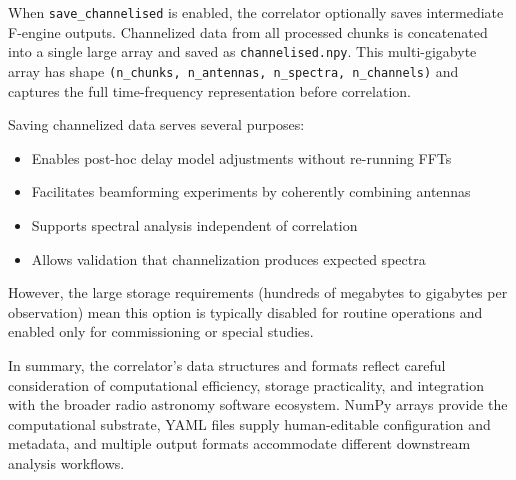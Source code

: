 When \texttt{save\_channelised} is enabled, the correlator optionally saves intermediate F-engine outputs. Channelized data from all processed chunks is concatenated into a single large array and saved as \texttt{channelised.npy}. This multi-gigabyte array has shape \texttt{(n\_chunks, n\_antennas, n\_spectra, n\_channels)} and captures the full time-frequency representation before correlation.

Saving channelized data serves several purposes:

\begin{itemize}
    \item Enables post-hoc delay model adjustments without re-running FFTs
    \item Facilitates beamforming experiments by coherently combining antennas
    \item Supports spectral analysis independent of correlation
    \item Allows validation that channelization produces expected spectra
\end{itemize}

However, the large storage requirements (hundreds of megabytes to gigabytes per observation) mean this option is typically disabled for routine operations and enabled only for commissioning or special studies.

In summary, the correlator's data structures and formats reflect careful consideration of computational efficiency, storage practicality, and integration with the broader radio astronomy software ecosystem. NumPy arrays provide the computational substrate, YAML files supply human-editable configuration and metadata, and multiple output formats accommodate different downstream analysis workflows.
